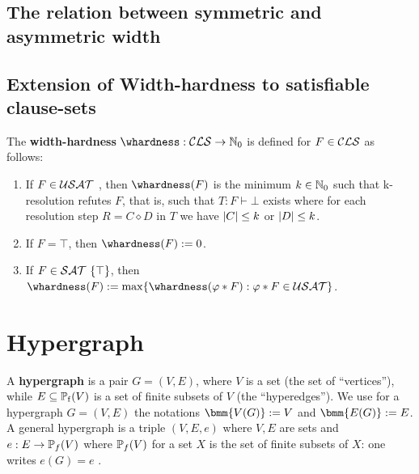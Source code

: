 \documentclass[12pt]{book}
\begin{document}
\subsection{The relation between symmetric and asymmetric width}
\label{sec:The relation between wid awid}


\subsection{Extension of Width-hardness to satisfiable clause-sets}
\label{sec:extensionWidth-hardness}

\begin{defi}\label{def:ex-whd}  
      The \textbf{width-hardness} $\whardness : \Cls \rightarrow \NNZ$  is defined for $F \in \mathcal{CLS}$ as follows:
	  \begin{enumerate}
              \item If $F \in \mathcal{USAT}$ , then $\whardness(F)$ is the minimum $k \in \mathbb{N}_0$ such that k-resolution refutes $F$, that is, such that
			  $T : F \vdash \bot$ exists where for each resolution step $R = C  \diamond D$ in $T$ we have $ \lvert C  \rvert \leq k$ or $\lvert D  \rvert \leq k$.
			  \item If $F = \top$, then $\whardness(F) := 0$.
			  \item If $F \in \mathcal{SAT} \ \{ \top \}$, then $\whardness(F) := \max \{\whardness(\varphi * F) : \varphi * F \in \Usat\}$.
      \end{enumerate}
\end{defi}

\section{Hypergraph}
\label{sec:Hypergraph}

\begin{defi}\label{def:hypergraphs}
  A \textbf{hypergraph} is a pair $G=(V,E)$, where $V$ is a set (the set of ``vertices''), while $E \subseteq \operatorname{\mathbb{P}_f}(V)$ is a set of finite subsets of $V$ (the ``hyperedges''). 
  We use for a hypergraph $G = (V,E)$ the notations $\bmm{V(G)} := V$ and $\bmm{E(G)} := E$. A general hypergraph is a triple $(V,E,e)$ where $V, E$ are sets and $e:E \rightarrow \operatorname{\mathbb{P}}_f(V)$ 
  where $\operatorname{\mathbb{P}}_f(V)$ for a set $X$ is the set of finite subsets of $X$: one writes $e(G)=e$ \cite{h5}. 
\end{defi}
\end{document}
